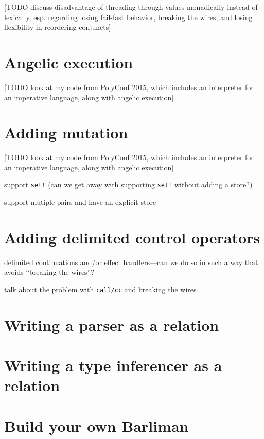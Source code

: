 \documentclass{book}
\begin{document}
[TODO discuss disadvantage of threading through values monadically instead of lexically, esp. regarding losing fail-fast behavior, breaking the wires, and losing flexibility in reordering conjuncts]

\chapter{Angelic execution}%

[TODO look at my code from PolyConf 2015, which includes an interpreter for an imperative language, along with angelic execution]

\chapter{Adding mutation}%

[TODO look at my code from PolyConf 2015, which includes an interpreter for an imperative language, along with angelic execution]

support \verb|set!| (can we get away with supporting \verb|set!| without adding a store?)

support mutiple pairs and have an explicit store


\chapter{Adding delimited control operators}%

delimited continuations and/or effect handlers---can we do so in such a way that avoids ``breaking the wires''?

talk about the problem with \verb|call/cc| and breaking the wires



\chapter{Writing a parser as a relation}%


\chapter{Writing a type inferencer as a relation}%


\chapter{Build your own Barliman}%
\end{document}

